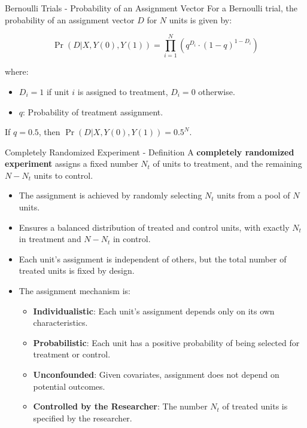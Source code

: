 \documentclass[xcolor=svgnames,t]{beamer}
\begin{document}
\begin{frame}{Bernoulli Trials - Probability of an Assignment Vector}
    For a Bernoulli trial, the probability of an assignment vector \( D \) for \( N \) units is given by:
    
    \[
    \Pr(D | X, Y(0), Y(1)) = \prod_{i=1}^N \left( q^{D_i} \cdot (1 - q)^{1 - D_i} \right)
    \]
    
    where:
    \begin{itemize}
        \item \( D_i = 1 \) if unit \( i \) is assigned to treatment, \( D_i = 0 \) otherwise.
        \item \( q \): Probability of treatment assignment.
    \end{itemize}
    If \( q = 0.5 \), then \( \Pr(D | X, Y(0), Y(1)) = 0.5^N \).
\end{frame}


\begin{frame}{Completely Randomized Experiment - Definition}
    A \textbf{completely randomized experiment} assigns a fixed number \( N_t \) of units to treatment, and the remaining \( N - N_t \) units to control.
    
    \begin{itemize}
        \item The assignment is achieved by randomly selecting \( N_t \) units from a pool of \( N \) units.
        \item Ensures a balanced distribution of treated and control units, with exactly \( N_t \) in treatment and \( N - N_t \) in control.
        \item Each unit's assignment is  independent of others, but the total number of treated units is fixed by design.
        \item The assignment mechanism is:
            \begin{itemize}
                \item \textbf{Individualistic}: Each unit’s assignment depends only on its own characteristics.
                \item \textbf{Probabilistic}: Each unit has a positive probability of being selected for treatment or control.
                \item \textbf{Unconfounded}: Given covariates, assignment does not depend on potential outcomes.
                \item \textbf{Controlled by the Researcher}: The number \( N_t \) of treated units is specified by the researcher.
            \end{itemize}
    \end{itemize}
\end{frame}
\end{document}
